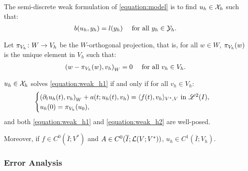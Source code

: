 \begin{definition}
    The semi-discrete weak formulation of \cref{equation:model} is to find $u_h \in \mathcal{X}_h$ such that:
    \begin{align} \label{equation:weak_h1}
        b(u_h, y_h) &= l(y_h) &\text{ for all } y_h \in \mathcal{Y}_h.
    \end{align}
\end{definition}

\begin{definition}[$\ProjectionOnto{V_h}$]
    Let $\pi_{V_h} \colon W \rightarrow V_h$ be the $W$-orthogonal projection, that is, for all $w \in W$, $\pi_{V_h}(w)$ is the unique element in $V_h$ such that:
    \begin{align}
        \left( w - \pi_{V_h}(w), v_h \right)_W &= 0 &\text{ for all } v_h \in V_h.
    \end{align}
\end{definition}

\begin{proposition}[Equivalence]
    $u_h \in \mathcal{X}_h$ solves \cref{equation:weak_h1} if and only if for all $v_h \in V_h$:
    \begin{align}
        \begin{cases} \label{equation:weak_h2}
            \left( \partial_t u_h(t), v_h \right)_W + a(t; u_h(t), v_h) = \langle f(t), v_h \rangle_{V^*, V} \text{ in } \mathscr{L}^{2}(I), \\
            u_h(0) = \pi_{V_h}(u_0),
        \end{cases}
    \end{align}
    and both \cref{equation:weak_h1} and \cref{equation:weak_h2} are well-posed.

    Moreover, if $f \in C^0(\overline{I}; V^*)$ and $A \in C^0(\overline{I}; \mathcal{L}(V; V^*))$, $u_h \in C^1(\overline{I}; V_h)$.
\end{proposition}

\subsubsection{Error Analysis}




